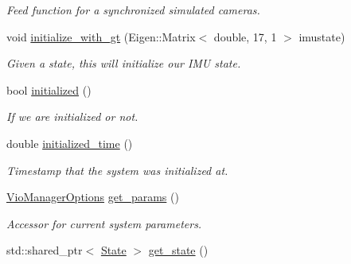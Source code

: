 \begin{DoxyCompactItemize}
\begin{DoxyCompactList}\small\item\em Feed function for a synchronized simulated cameras. \end{DoxyCompactList}\item 
void \hyperlink{classov__msckf_1_1VioManager_a196e1780d418021e2c41a394747e872b}{initialize\+\_\+with\+\_\+gt} (Eigen\+::\+Matrix$<$ double, 17, 1 $>$ imustate)
\begin{DoxyCompactList}\small\item\em Given a state, this will initialize our I\+MU state. \end{DoxyCompactList}\item 
\mbox{\label{classov__msckf_1_1VioManager_ae463166d4a27c3576fab416751bea40f}} 
bool \hyperlink{classov__msckf_1_1VioManager_ae463166d4a27c3576fab416751bea40f}{initialized} ()
\begin{DoxyCompactList}\small\item\em If we are initialized or not. \end{DoxyCompactList}\item 
\mbox{\label{classov__msckf_1_1VioManager_a12069947bc27ee0595978f2d188551bc}} 
double \hyperlink{classov__msckf_1_1VioManager_a12069947bc27ee0595978f2d188551bc}{initialized\+\_\+time} ()
\begin{DoxyCompactList}\small\item\em Timestamp that the system was initialized at. \end{DoxyCompactList}\item 
\mbox{\label{classov__msckf_1_1VioManager_addbe77f2b0c6554b9f1baa5071b8c6d2}} 
\hyperlink{structov__msckf_1_1VioManagerOptions}{Vio\+Manager\+Options} \hyperlink{classov__msckf_1_1VioManager_addbe77f2b0c6554b9f1baa5071b8c6d2}{get\+\_\+params} ()
\begin{DoxyCompactList}\small\item\em Accessor for current system parameters. \end{DoxyCompactList}\item 
\mbox{\label{classov__msckf_1_1VioManager_abcdebe3b9debe73fb6a11b1c3b899eb1}} 
std\+::shared\+\_\+ptr$<$ \hyperlink{classov__msckf_1_1State}{State} $>$ \hyperlink{classov__msckf_1_1VioManager_abcdebe3b9debe73fb6a11b1c3b899eb1}{get\+\_\+state} ()

\end{DoxyCompactItemize}

